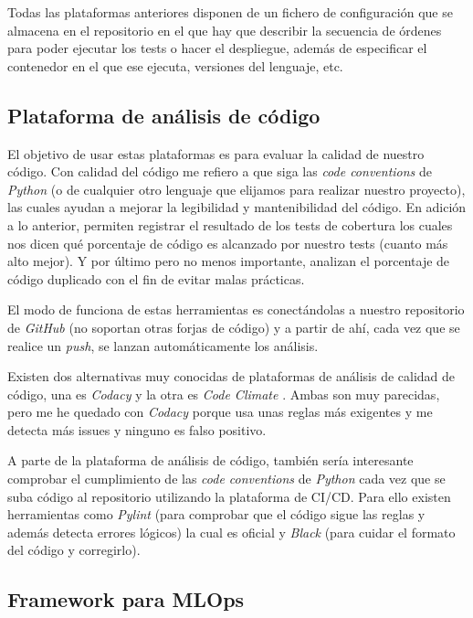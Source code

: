 Todas las plataformas anteriores disponen de un fichero de configuración que se almacena en el repositorio en el que hay que describir la secuencia de órdenes para poder ejecutar los tests o hacer el despliegue, además de especificar el contenedor en el que ese ejecuta, versiones del lenguaje, etc.

\subsection{Plataforma de análisis de código}

El objetivo de usar estas plataformas es para evaluar la calidad de nuestro código. Con calidad del código me refiero a que siga las \textit{code conventions} de \textit{Python} (o de cualquier otro lenguaje que elijamos para realizar nuestro proyecto), las cuales ayudan a mejorar la legibilidad y mantenibilidad del código. En adición a lo anterior, permiten registrar el resultado de los tests de cobertura los cuales nos dicen qué porcentaje de código es alcanzado por nuestro tests (cuanto más alto mejor). Y por último pero no menos importante, analizan el porcentaje de código duplicado con el fin de evitar malas prácticas.\newline

El modo de funciona de estas herramientas es conectándolas a nuestro repositorio de \textit{GitHub} (no soportan otras forjas de código) y a partir de ahí, cada vez que se realice un \textit{push}, se lanzan automáticamente los análisis.\newline

Existen dos alternativas muy conocidas de plataformas de análisis de calidad de código, una es \textit{Codacy} \cite{codacy} y la otra es \textit{Code Climate} \cite{codeclimate}. Ambas son muy parecidas, pero me he quedado con \textit{Codacy} porque usa unas reglas más exigentes y me detecta más issues y ninguno es falso positivo.\newline

A parte de la plataforma de análisis de código, también sería interesante comprobar el cumplimiento de las \textit{code conventions} de \textit{Python} cada vez que se suba código al repositorio utilizando la plataforma de CI/CD. Para ello existen herramientas como \textit{Pylint} (para comprobar que el código sigue las reglas y además detecta errores lógicos) la cual es oficial y \textit{Black} (para cuidar el formato del código y corregirlo). 

\subsection{Framework para MLOps}


